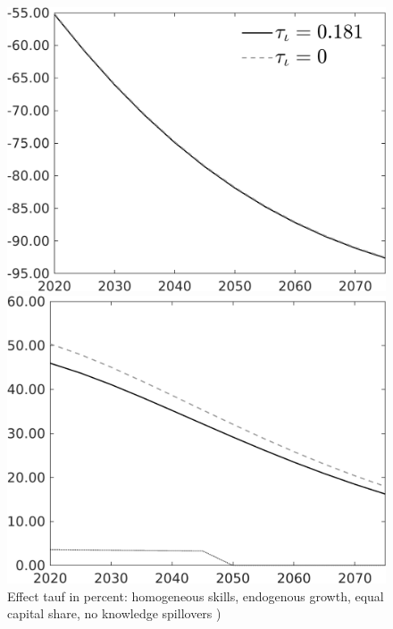 \documentclass[12pt]{article}
\begin{document}
\begin{figure}[h!!]
	\centering
	\caption{Effect tauf in percent: homogeneous skills, endogenous growth, equal capital share, no knowledge spillovers )}\label{fig:Leveltauf_nsk1_xgr0_equalcapShare_noknow_notaul}
	\begin{minipage}[]{0.32\textwidth}
		\includegraphics[width=1\textwidth]{../../codding_model/own_basedOnFried/optimalPol_010922_revision/figures/all_13Sept22/PerdifNoTauf_Equlab_regime0_CompTaul_Emnet_spillover0_nsk1_xgr0_knspil1_sep1_LFlimit0_emsbase0_countec0_GovRev0_etaa0.79_lgd1.png}
	\end{minipage}	
	\begin{minipage}[]{0.32\textwidth}
		\includegraphics[width=1\textwidth]{../../codding_model/own_basedOnFried/optimalPol_010922_revision/figures/all_13Sept22/CompTauf_bytaul_Equlab_Reg0_Emnet_spillover0_nsk1_xgr0_knspil1_sep1_LFlimit0_emsbase0_countec0_GovRev0_etaa0.79_lgd0.png}

\end{minipage}
\end{figure}
\end{document}
